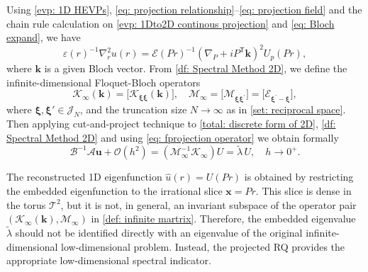 \documentclass[11pt]{article}
\newcommand{\alter}{\textcolor{blue}}
\def\k{\mathbf{k}}
\def\x{\mathbf{x}}
\numberwithin{equation}{section}
\begin{document}
Using \eqref{evp: 1D HEVPs}, \eqref{eq: projection relationship}--\eqref{eq: projection field} and the chain rule calculation on \eqref{evp: 1Dto2D continous projection} and \eqref{eq: Bloch expand}, we have
\begin{equation}\label{eq: fprojection operator}
\varepsilon(r)^{-1} \nabla_r^2 u(r)
=
\mathcal{E}(Pr)^{-1} \left( \nabla_P + i P^\mathsf{T} \k \right)^2 U_p(Pr),
\end{equation}
where $\k$ is a given Bloch vector. From \eqref{df: Spectral Method 2D}, we define the infinite-dimensional Floquet-Bloch operators
\begin{equation}\label{def: infinite martrix}
\mathcal{K}_\infty(\k) = \bigl[ \mathcal{K}_{\boldsymbol{\xi}\boldsymbol{\xi}}(\k) \bigr], \quad \mathcal{M}_\infty = \bigl[ \mathcal{M}_{\boldsymbol{\xi}\boldsymbol{\xi}^{\prime}} \bigr] = \bigl[ \mathcal{E}_{\boldsymbol{\xi}^{\prime}-\boldsymbol{\xi}} \bigr],
\end{equation}
where \(\boldsymbol{\xi}, \boldsymbol{\xi}' \in \mathcal{J}_N\), and the truncation size \(N \to \infty\) as in \eqref{set: reciprocal space}. Then applying cut-and-project technique to \eqref{total: discrete form of 2D}, \eqref{df: Spectral Method 2D} and using \eqref{eq: fprojection operator} we obtain formally
\begin{equation} \label{eq: finite estimate to infinite}
\mathcal{B}^{-1} \mathcal{A} \boldsymbol{u} + \mathcal{O}(h^2)
=
\left( \mathcal{M}_\infty^{-1} \mathcal{K}_\infty \right) U
=
\widetilde{\lambda}\, U, \quad h \to 0^+.
\end{equation}


The reconstructed 1D eigenfunction $\widehat{u}(r)=U(Pr)$ is obtained by restricting the embedded eigenfunction to the irrational slice $\mathbf{x}=Pr$. This slice is dense in the torus $\mathcal{T}^2$, but it is not, in general, an invariant subspace of the operator pair $(\mathcal{K}_\infty(\mathbf{k}),\mathcal{M}_\infty)$ in \eqref{def: infinite martrix}. Therefore, the embedded eigenvalue $\widetilde{\lambda}$ should not be identified directly with an eigenvalue of the original infinite-dimensional low-dimensional problem. Instead, the projected RQ provides the appropriate low-dimensional spectral indicator.
\end{document}
